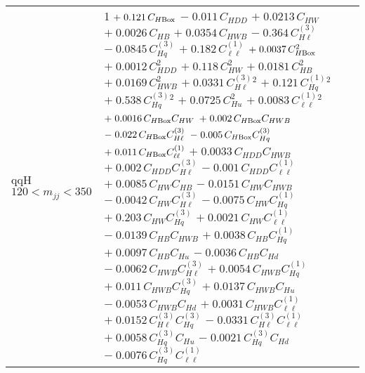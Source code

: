 \begin{tabular}{l|p{}}
    qqH $120 < m_{jj} < 350$ & 1 $+\;0.121\,C_{H\rm{Box}}$ $-\;0.011\,C_{HDD}$ $+\;0.0213\,C_{HW}$ $+\;0.0026\,C_{HB}$ $+\;0.0354\,C_{HWB}$ $-\;0.364\,C^{(3)}_{H\ell}$ $-\;0.0845\,C^{(3)}_{Hq}$ $+\;0.182\,C^{(1)}_{\ell\ell}$ $+\;0.0037\,C_{H\rm{Box}}^{2}$ $+\;0.0012\,C_{HDD}^{2}$ $+\;0.118\,C_{HW}^{2}$ $+\;0.0181\,C_{HB}^{2}$ $+\;0.0169\,C_{HWB}^{2}$ $+\;0.0331\,C^{(3)}_{H\ell}^{2}$ $+\;0.121\,C^{(1)}_{Hq}^{2}$ $+\;0.538\,C^{(3)}_{Hq}^{2}$ $+\;0.0725\,C_{Hu}^{2}$ $+\;0.0083\,C^{(1)}_{\ell\ell}^{2}$ $+\;0.0016\,C_{H\rm{Box}}C_{HW}$ $+\;0.002\,C_{H\rm{Box}}C_{HWB}$ $-\;0.022\,C_{H\rm{Box}}C^{(3)}_{H\ell}$ $-\;0.005\,C_{H\rm{Box}}C^{(3)}_{Hq}$ $+\;0.011\,C_{H\rm{Box}}C^{(1)}_{\ell\ell}$ $+\;0.0033\,C_{HDD}C_{HWB}$ $+\;0.002\,C_{HDD}C^{(3)}_{H\ell}$ $-\;0.001\,C_{HDD}C^{(1)}_{\ell\ell}$ $+\;0.0085\,C_{HW}C_{HB}$ $-\;0.0151\,C_{HW}C_{HWB}$ $-\;0.0042\,C_{HW}C^{(3)}_{H\ell}$ $-\;0.0075\,C_{HW}C^{(1)}_{Hq}$ $+\;0.203\,C_{HW}C^{(3)}_{Hq}$ $+\;0.0021\,C_{HW}C^{(1)}_{\ell\ell}$ $-\;0.0139\,C_{HB}C_{HWB}$ $+\;0.0038\,C_{HB}C^{(1)}_{Hq}$ $+\;0.0097\,C_{HB}C_{Hu}$ $-\;0.0036\,C_{HB}C_{Hd}$ $-\;0.0062\,C_{HWB}C^{(3)}_{H\ell}$ $+\;0.0054\,C_{HWB}C^{(1)}_{Hq}$ $+\;0.011\,C_{HWB}C^{(3)}_{Hq}$ $+\;0.0137\,C_{HWB}C_{Hu}$ $-\;0.0053\,C_{HWB}C_{Hd}$ $+\;0.0031\,C_{HWB}C^{(1)}_{\ell\ell}$ $+\;0.0152\,C^{(3)}_{H\ell}C^{(3)}_{Hq}$ $-\;0.0331\,C^{(3)}_{H\ell}C^{(1)}_{\ell\ell}$ $+\;0.0058\,C^{(3)}_{Hq}C_{Hu}$ $-\;0.0021\,C^{(3)}_{Hq}C_{Hd}$ $-\;0.0076\,C^{(3)}_{Hq}C^{(1)}_{\ell\ell}$ \\
\end{tabular}